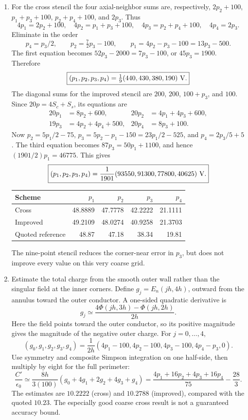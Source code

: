 \begin{enumerate}
\item[(a)] For the cross stencil the four axial-neighbor sums are, respectively,
$2p_2+100$, $p_1+p_3+100$, $p_2+p_4+100$, and $2p_3$.
Thus
\[
4p_1=2p_2+100,\quad4p_2=p_1+p_3+100,\quad
4p_3=p_2+p_4+100,\quad4p_4=2p_3.
\]
Eliminate in the order
\[
p_4=p_3/2,\qquad p_2=\tfrac72p_3-100,\qquad
p_1=4p_2-p_3-100=13p_3-500.
\]
The first equation becomes $52p_3-2000=7p_3-100$, or $45p_3=1900$.
Therefore
\[
\boxed{(p_1,p_2,p_3,p_4)=\tfrac19(440,430,380,190)\ {\rm V}.}
\]
The diagonal sums for the improved stencil are $200$, $200$, $100+p_3$,
and $100$. Since $20p=4S_c+S_s$, its equations are
\[
\begin{aligned}
20p_1&=8p_2+600,&20p_2&=4p_1+4p_3+600,\\
19p_3&=4p_2+4p_4+500,&20p_4&=8p_3+100.
\end{aligned}
\]
Now $p_2=5p_1/2-75$, $p_3=5p_2-p_1-150=23p_1/2-525$, and
$p_4=2p_3/5+5$. The third equation becomes $87p_3=50p_1+1100$, and hence
$(1901/2)p_1=46775$. This gives
\[
\boxed{(p_1,p_2,p_3,p_4)
=\frac1{1901}(93550,91300,77800,40625)\ {\rm V}.}
\]
\begin{center}
\begin{tabular}{lrrrr}\toprule
Scheme&$p_1$&$p_2$&$p_3$&$p_4$\\\midrule
Cross&48.8889&47.7778&42.2222&21.1111\\
Improved&49.2109&48.0274&40.9258&21.3703\\
Quoted reference&48.87&47.18&38.34&19.81\\\bottomrule
\end{tabular}
\end{center}
The nine-point stencil reduces the corner-near error in $p_3$, but does not
improve every value on this very coarse grid.
\item[(b)] Estimate the total charge from the smooth outer wall rather than
the singular field at the inner corners. Define $g_j=E_n(jh,4h)$, outward
from the annulus toward the outer conductor. A one-sided quadratic derivative is
\[
g_j\simeq\frac{4\Phi(jh,3h)-\Phi(jh,2h)}{2h}.
\]
Here the field points toward the outer conductor, so its positive magnitude
gives the magnitude of the negative outer charge. For $j=0,\ldots,4$,
\[
(g_0,g_1,g_2,g_3,g_4)=\frac1{2h}
(4p_1-100,4p_2-100,4p_3-100,4p_4-p_3,0).
\]
Use symmetry and composite Simpson integration on one half-side, then
multiply by eight for the full perimeter:
\[
\frac{C'}{\epsilon_0}\simeq
\frac{8h}{3(100)}(g_0+4g_1+2g_2+4g_3+g_4)
=\frac{4p_1+16p_2+4p_3+16p_4}{75}-\frac{28}{3}.
\]
The estimates are $\boxed{10.2222}$ (cross) and $\boxed{10.2788}$ (improved),
compared with the quoted $10.23$. The especially good coarse cross result
is not a guaranteed accuracy bound.


\end{enumerate}
